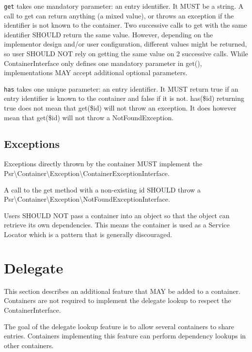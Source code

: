 \begin{compactitem}
\item \texttt{get} takes one mandatory parameter: an entry identifier. It MUST be a string. A call to get can return anything (a mixed value), or throws an exception if the identifier is not known to the container. Two successive calls to get with the same identifier SHOULD return the same value. However, depending on the implementor design and/or user configuration, different values might be returned, so user SHOULD NOT rely on getting the same value on 2 successive calls. While ContainerInterface only defines one mandatory parameter in get(), implementations MAY accept additional optional parameters.

\item \texttt{has} takes one unique parameter: an entry identifier. It MUST return true if an entry identifier is known to the container and false if it is not. has(\$id) returning true does not mean that get(\$id) will not throw an exception. It does however mean that get(\$id) will not throw a NotFoundException.

\end{compactitem}


\subsection{Exceptions}

Exceptions directly thrown by the container MUST implement the Psr\textbackslash Container\textbackslash Exception\textbackslash ContainerExceptionInterface.

A call to the get method with a non-existing id SHOULD throw a Psr\textbackslash Container\textbackslash Exception\textbackslash NotFoundExceptionInterface.

Users SHOULD NOT pass a container into an object so that the object can retrieve its own dependencies. This means the container is used as a Service Locator which is a pattern that is generally discouraged.

\section{Delegate}

This section describes an additional feature that MAY be added to a container. Containers are not required to implement the delegate lookup to respect the ContainerInterface.

The goal of the delegate lookup feature is to allow several containers to share entries. Containers implementing this feature can perform dependency lookups in other containers.

